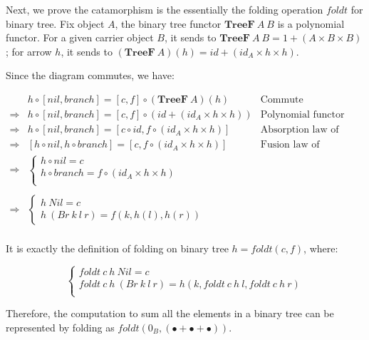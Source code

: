 \documentclass[b5paper]{article}
\begin{document}
\begin{example}
Next, we prove the catamorphism is the essentially the folding operation $foldt$ for binary tree. Fix object $A$, the binary tree functor $\mathbf{TreeF}\ A\ B$ is a polynomial functor. For a given carrier object $B$, it sends to $\mathbf{TreeF}\ A\ B = 1 + (A \times B \times B)$; for arrow $h$, it sends to $(\mathbf{TreeF}\ A)(h) = id + (id_A \times h \times h)$.

Since the diagram commutes, we have:

\[
\begin{array}{rll}
            & h \circ [nil, branch] = [c, f] \circ (\mathbf{TreeF}\ A)(h) & \text{Commute} \\
\Rightarrow & h \circ [nil, branch] = [c, f] \circ (id + (id_A \times h \times h)) & \text{Polynomial functor} \\
\Rightarrow & h \circ [nil, branch] = [c \circ id, f \circ (id_A \times h \times h)] & \text{Absorption law of coproduct on the right} \\
\Rightarrow & [h \circ nil, h \circ branch] = [c, f \circ (id_A \times h \times h)] & \text{Fusion law of coproduct on the left} \\
\Rightarrow &
  \begin{cases}
    h \circ nil = c \\
    h \circ branch = f \circ (id_A \times h \times h) \\
  \end{cases} & \\
\\
\Rightarrow &
  \begin{cases}
    h\ Nil = c \\
    h\ (Br\ k\ l\ r) = f(k, h(l), h(r))
  \end{cases} & \\
\end{array}
\]

It is exactly the definition of folding on binary tree $h = foldt(c, f)$, where:

\[
\begin{cases}
foldt\ c\ h\ Nil = c \\
foldt\ c\ h\ (Br\ k\ l\ r) = h(k, foldt\ c\ h\ l, foldt\ c\ h\ r) \\
\end{cases}
\]

Therefore, the computation to sum all the elements in a binary tree can be represented by folding as $foldt(0_B, (\bullet + \bullet + \bullet))$.
\end{example}
\end{document}
